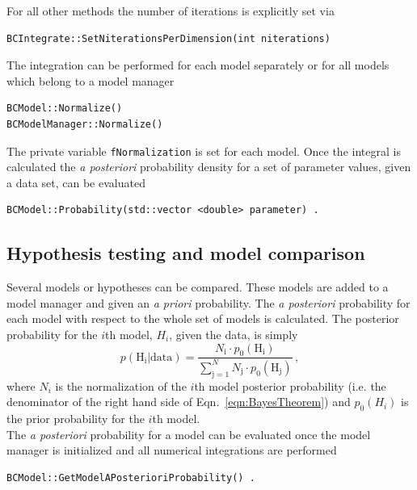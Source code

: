 \documentclass[11pt, a4paper]{article}
\begin{document}
\noindent 
For all other methods the number of iterations is explicitly set via 
%
\begin{verbatim}
BCIntegrate::SetNiterationsPerDimension(int niterations) 
\end{verbatim} 

\noindent 
The integration can be performed for each model separately or for all models which belong to a model manager 
%
\begin{verbatim}
BCModel::Normalize() 
BCModelManager::Normalize()
\end{verbatim} 

\noindent 
The private variable \verb|fNormalization| is set for each model. Once
the integral is calculated the {\it a posteriori} probability density for a
set of parameter values, given a data set, can be evaluated

\begin{verbatim} 
BCModel::Probability(std::vector <double> parameter) .  
\end{verbatim} 


\subsection{Hypothesis testing and model comparison} 

Several models or hypotheses can be compared. These models are added
to a model manager and given an {\it a priori} probability. The {\it a
posteriori} probability for each model with respect to the whole set
of models is calculated. The posterior probability for the $i$th
model, $H_{i}$, given the data, is simply
%
\begin{equation}
p(\mathrm{H_{i}}|\mathrm{data}) = \frac{N_{\mathrm{i}} \cdot p_{0}(\mathrm{H_{i}})}{\sum_{\mathrm{j} = 1}^{N} N_{\mathrm{j}} \cdot p_{0}(\mathrm{H_{j}})} \, , 
\end{equation}
%
where $N_{i}$ is the normalization of the $i$th model posterior
probability (i.e. the denominator of the right hand side of
Eqn.~\ref{eqn:BayesTheorem}) and $p_{0}(H_{i})$ is the prior
probability for the $i$th model. \\ 

\noindent 
The {\it a posteriori} probability for a model can be evaluated once the
model manager is initialized and all numerical integrations are
performed
%
\begin{verbatim}
BCModel::GetModelAPosterioriProbability() . 
\end{verbatim}
\end{document}
